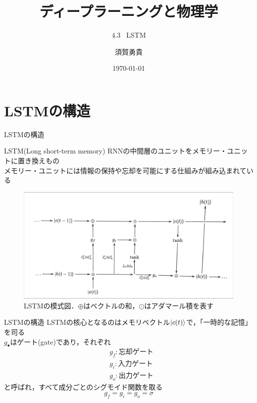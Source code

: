 \documentclass[dvipdfmx,8pt]{beamer}
\title{ディープラーニングと物理学}
\subtitle{4.3 \ LSTM}
\author[須賀]{須賀勇貴}
\institute[茨大]{茨城大学大学院 \ 理工学研究科 \ 量子線科学専攻 \ 2年}
\date{\today}
\begin{document}
\frame{\maketitle}
  \section{LSTMの構造}
  \begin{frame}{LSTMの構造}
    \begin{block}{LSTM(Long short-term memory)}
      RNNの中間層のユニットをメモリー・ユニットに置き換えもの\\
      メモリー・ユニットには情報の保持や忘却を可能にする仕組みが組み込まれている      
    \end{block}
    \begin{figure}
      \begin{center}
        \includegraphics[height=5.7cm]{LSTM_diagram.jpeg}
      \end{center}
      \caption{LSTMの模式図．$\oplus$はベクトルの和，$\odot$はアダマール積を表す}
    \end{figure}
  \end{frame}

  \begin{frame}{LSTMの構造}
    LSTMの核心となるのはメモリベクトル$\ket{c(t)}$で，「一時的な記憶」を司る\\
    \vspace{0.3cm}
    $g_{\bullet}$はゲート(gate)であり，それぞれ
    \begin{align*}
      & g_f : \text{忘却ゲート}\\
      & g_i : \text{入力ゲート}\\
      & g_o : \text{出力ゲート}
    \end{align*}
    と呼ばれ，すべて成分ごとのシグモイド関数を取る
    \begin{equation*}
      g_f = g_i = g_o = \sigma
    \end{equation*}
  \end{frame}
\end{document}
